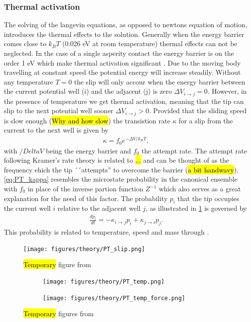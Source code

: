 \subsubsection{Thermal activation}
The solving of the langevin equations, as opposed to newtons equation of motion, introduces the thermal effects to the solution. Generally when the energy barrier comes close to $k_B T$ (0.026 eV at room temperature) thermal effects can not be neglected. In the case of a single asperity contact the energy barrier is on the order 1 eV which make thermal activation significant \cite{Yalin_2011}. Due to the moving body travelling at constant speed the potential energy will increase steadily. Without any temperature $T = 0$ the slip will only accour when the energy barrier between the current potential well (i) and the adjacent (j) is zero $\Delta V_{i\to j} = 0$. However, in the presence of temperature we get thermal activation, meaning that the tip can slip to the next potential well sooner $\Delta V_{i\to j} > 0$. Provided that the sliding speed is slow enough (\hl{Why and how slow}) the transistion rate $\kappa$ for a slip from the current to the next well is given by
\begin{align}
  \kappa = f_0 e^{-\Delta V / k_B T},
  \label{eq:PT_kappa}
\end{align}
with $/Delta V$ being the energy barrier and $f_0$ the attempt rate. The attempt rate following Kramer’s rate theory \cite{RevModPhys.62.251} is related to \hl{...} and can be thought of as the frequency ehich the tip ´´attempts'' to overcome the barrier (\hl{a bit handwavy}). \cref{eq:PT_kappa} resembles the microstate probability in the canonical ensemble with $f_0$ in place of the inverse partion function $Z^{-1}$ which also serves as a great explanation for the need of this factor. The probability $p_i$ that the tip occupies the current well $i$ relative to the adjacent well $j$, as illustrated in \cref{fig:PT_slip} is governed by 
\begin{align*}
  \frac{dp_i}{dt} = -\kappa_{i\to j}p_i + \kappa_{j\to i}p_j.
\end{align*}
This probability is related to temperature, speed and mass through \label{eq:PT_kappa}. 

\begin{figure}[H]
  \centering
  \texttt{[image: figures/theory/PT\_slip.png]}
  \caption{\hl{Temporary} figure from \cite{Yalin_2011}}
  \label{fig:PT_slip}
\end{figure}


\begin{figure}[H]
  \centering
  \begin{subfigure}[t]{0.49\textwidth}
      \centering
      \texttt{[image: figures/theory/PT\_temp.png]}
      \caption{}
      \label{fig:PT_temp_a}
  \end{subfigure}
  \hfill
  \begin{subfigure}[t]{0.49\textwidth}
      \centering
      \texttt{[image: figures/theory/PT\_temp\_force.png]}
      \caption{}
      \label{fig:PT_temp_b}
  \end{subfigure}
  \hfill
  \hfill
     \caption{\hl{Temporary} figures from \cite{Yalin_2011}}
     \label{fig:PT_temp}
\end{figure}

